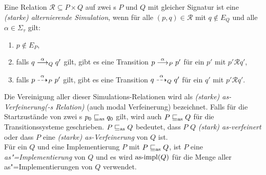 \begin{Def}
  \label{SimDef}
  Eine Relation $\mathcal{R}\subseteq P \times Q$ auf zwei \MEIO{}s $P$ und $Q$
  mit gleicher Signatur ist eine \emph{(starke) alternierende Simulation}, wenn
  für alle $(p,q)\in \mathcal{R}$ mit $q\notin E_Q$ und alle $\alpha\in\Sigma
  _\tau$ gilt:
  \begin{enumerate}
    \item $p\notin E_P$,
    \item falls $q\must[\alpha]_Q q'$ gilt, gibt es eine Transition
      $p\must[\alpha]_P p'$ für ein $p'$ mit $p'\mathcal{R}q'$,
    \item falls $p\may[\alpha]_P p'$ gilt, gibt es eine Transition
      $q\may[\alpha]_Q q'$ für ein $q'$ mit $p'\mathcal{R}q'$.
  \end{enumerate}
  Die Vereinigung \asRel{} aller dieser Simulations-Relationen wird als
  \emph{(starke) as-Verfeinerung(-s Relation)} (auch modal Verfeinerung)
  bezeichnet. Falls für die Startzustände von zwei \MEIO{}s $p_0\sqsubseteq _{\mathrm{as}} q_0$
  gilt, wird auch $P\sqsubseteq _{\mathrm{as}} Q$ für die Transitionssysteme geschrieben. $P\sqsubseteq _{\mathrm{as}}
  Q$ bedeutet, dass $P$ $Q$ \emph{(stark) as-verfeinert} oder dass $P$ eine
  \emph{(starke) as-Verfeinerung} von $Q$ ist.\\
  Für ein \MEIO{} $Q$ und eine Implementierung $P$ mit $P\sqsubseteq _{\mathrm{as}}{}Q$, ist
  $P$ eine \emph{as"=Implementierung} von $Q$ und es wird $\mathrm{as}\text{-}\mathrm{impl} (Q)$ für die
  Menge aller as"=Implementierungen von $Q$ verwendet.
\end{Def}

